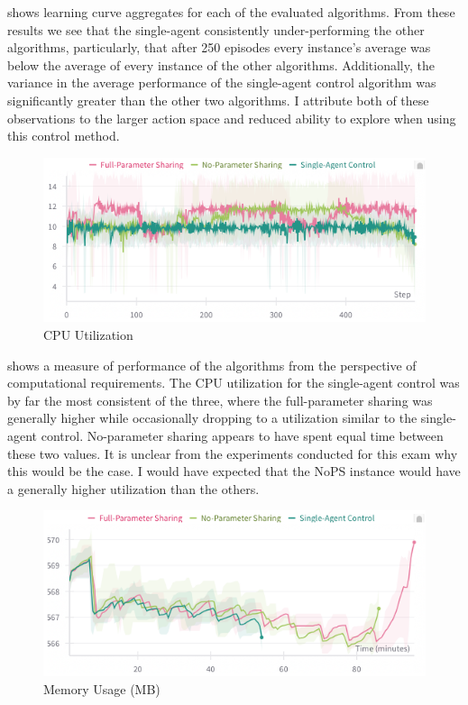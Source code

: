 \documentclass[12pt,letterpaper]{exam}
\begin{document}
\begin{questions}
 shows learning curve aggregates for each of the 
evaluated algorithms.
From these results we see that the single-agent consistently 
under-performing the other algorithms, particularly, that after 
250 episodes every instance's average was below the average of every 
instance of the other algorithms.
Additionally, the variance in the average performance of the single-agent
control algorithm was significantly greater than the other two algorithms.
I attribute both of these observations to the larger action space and reduced
ability to explore when using this control method.

\begin{figure}
    \centering
    \includegraphics[width=.63\linewidth]{cpu_use.png}
    \caption{CPU Utilization}
    \label{fig:cpu_use}
\end{figure}

 shows a measure of performance of the algorithms 
from the perspective of computational requirements.
The CPU utilization for the single-agent control was by far the most 
consistent of the three, where the full-parameter sharing was generally
higher while occasionally dropping to a utilization similar to the 
single-agent control. No-parameter sharing appears to have spent equal
time between these two values. 
It is unclear from the experiments conducted for this exam why this would
be the case. I would have expected that the NoPS instance would 
have a generally higher utilization than the others.

\begin{figure}
    \centering
    \includegraphics[width=.63\linewidth]{memory_use.png}
    \caption{Memory Usage (MB)}
    \label{fig:memory_use}
\end{figure}


\end{questions}
\end{document}
